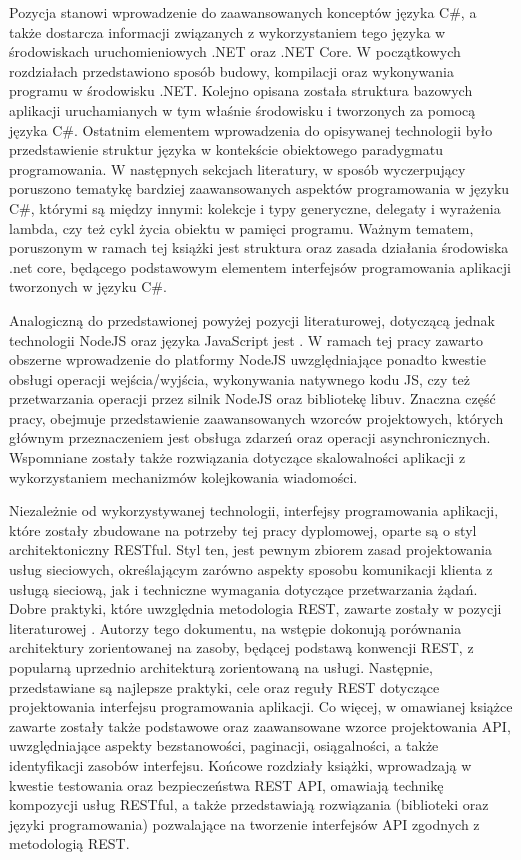 Pozycja \cite{troelsen2017pro} stanowi wprowadzenie do zaawansowanych konceptów języka C\#, a także dostarcza informacji związanych z wykorzystaniem tego języka w środowiskach uruchomieniowych .NET oraz .NET Core. W początkowych rozdziałach przedstawiono sposób budowy, kompilacji oraz wykonywania programu w środowisku .NET. Kolejno opisana została struktura bazowych aplikacji uruchamianych w tym właśnie środowisku i tworzonych za pomocą języka C\#. Ostatnim elementem wprowadzenia do opisywanej technologii było przedstawienie struktur języka w kontekście obiektowego paradygmatu programowania.    W następnych sekcjach literatury, w sposób wyczerpujący poruszono tematykę bardziej zaawansowanych aspektów programowania w języku C\#, którymi są między innymi: kolekcje i typy generyczne, delegaty i wyrażenia lambda, czy też cykl życia obiektu w pamięci programu. Ważnym tematem, poruszonym w ramach tej książki jest struktura oraz zasada działania środowiska .net core, będącego podstawowym elementem interfejsów programowania aplikacji tworzonych w języku C\#.

Analogiczną do przedstawionej powyżej pozycji literaturowej, dotyczącą jednak technologii NodeJS oraz języka JavaScript jest \cite{casciaro2020node}. W ramach tej pracy zawarto obszerne wprowadzenie do platformy NodeJS uwzględniające ponadto kwestie obsługi operacji wejścia/wyjścia, wykonywania natywnego kodu JS, czy też przetwarzania operacji przez silnik NodeJS oraz bibliotekę libuv. Znaczna część pracy, obejmuje przedstawienie zaawansowanych wzorców projektowych, których głównym przeznaczeniem jest obsługa zdarzeń oraz operacji asynchronicznych. Wspomniane zostały także rozwiązania dotyczące skalowalności aplikacji z wykorzystaniem mechanizmów kolejkowania wiadomości.

Niezależnie od wykorzystywanej technologii, interfejsy programowania aplikacji, które zostały zbudowane na potrzeby tej pracy dyplomowej, oparte są o styl architektoniczny RESTful. Styl ten, jest pewnym zbiorem zasad projektowania usług sieciowych, określającym zarówno aspekty sposobu komunikacji klienta z usługą sieciową, jak i techniczne wymagania dotyczące przetwarzania żądań. Dobre praktyki, które uwzględnia metodologia REST, zawarte zostały w pozycji literaturowej \cite{subramanian2019hands}. Autorzy tego dokumentu, na wstępie dokonują porównania architektury zorientowanej na zasoby, będącej podstawą konwencji REST, z popularną uprzednio architekturą zorientowaną na usługi. Następnie, przedstawiane są najlepsze praktyki, cele oraz reguły REST dotyczące projektowania interfejsu programowania aplikacji. Co więcej, w omawianej książce zawarte zostały także podstawowe oraz zaawansowane wzorce projektowania API, uwzględniające aspekty bezstanowości, paginacji, osiągalności, a także identyfikacji zasobów interfejsu. Końcowe rozdziały książki, wprowadzają w kwestie testowania oraz bezpieczeństwa REST API, omawiają technikę kompozycji usług RESTful, a także przedstawiają rozwiązania (biblioteki oraz języki programowania) pozwalające na tworzenie interfejsów API zgodnych z metodologią REST.

